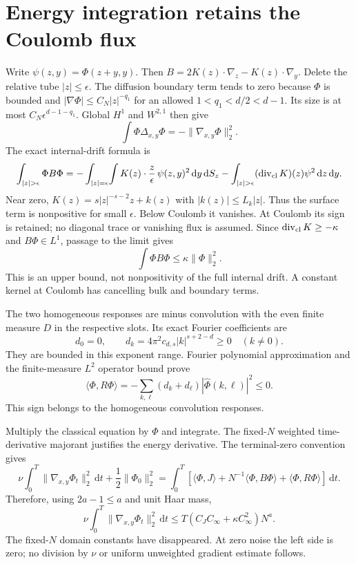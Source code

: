 \documentclass[10pt]{article}
\newcommand{\dd}{\,\mathrm d}
\begin{document}
\section*{Energy integration retains the Coulomb flux}
Write $\psi(z,y)=\Phi(z+y,y)$. Then
$B=2K(z)\cdot\nabla_z-K(z)\cdot\nabla_y$.
Delete the relative tube $|z|\le\epsilon$. The diffusion boundary term tends
to zero because $\Phi$ is bounded and
$|\nabla\Phi|\le C_N|z|^{-q_1}$ for an allowed $1<q_1<d/2<d-1$.
Its size is at most $C_N\epsilon^{d-1-q_1}$. Global $H^1$ and $W^{2,1}$
then give
\[
 \int\Phi\Delta_{x,y}\Phi=-\|\nabla_{x,y}\Phi\|_2^2.
\]
The exact internal-drift formula is
\[
 \int_{|z|>\epsilon}\Phi B\Phi
 =-\int_{|z|=\epsilon}\!\int K(z)\cdot\frac z\epsilon\,
        \psi(z,y)^2\dd y\dd S_z
  -\int_{|z|>\epsilon}(\operatorname{div}_{\rm cl}K)(z)\psi^2\dd z\dd y.
\]
Near zero, $K(z)=s|z|^{-s-2}z+k(z)$ with $|k(z)|\le L_k|z|$.
Thus the surface term is nonpositive for small $\epsilon$. Below Coulomb
it vanishes. At Coulomb its sign is retained; no diagonal trace or vanishing
flux is assumed. Since $\operatorname{div}_{\rm cl}K\ge-\kappa$ and
$B\Phi\in L^1$, passage to the limit gives
\[
 \int\Phi B\Phi\le\kappa\|\Phi\|_2^2.
\]
This is an upper bound, not nonpositivity of the full internal drift. A
constant kernel at Coulomb has cancelling bulk and boundary terms.

The two homogeneous responses are minus convolution with the even finite
measure $D$ in the respective slots. Its exact Fourier coefficients are
\[
 d_0=0,\qquad d_k=4\pi^2c_{d,s}|k|^{s+2-d}\ge0\quad(k\ne0).
\]
They are bounded in this exponent range. Fourier polynomial approximation
and the finite-measure $L^2$ operator bound prove
\[
 \langle\Phi,R\Phi\rangle=-\sum_{k,\ell}(d_k+d_\ell)
 |\widehat\Phi(k,\ell)|^2\le0.
\]
This sign belongs to the homogeneous convolution responses.

Multiply the classical equation by $\Phi$ and integrate. The fixed-$N$
weighted time-derivative majorant justifies the energy derivative. The
terminal-zero convention gives
\[
 \nu\int_0^T\|\nabla_{x,y}\Phi_t\|_2^2\dd t+\frac12\|\Phi_0\|_2^2
 =\int_0^T\!\left[\langle\Phi,J\rangle+
 N^{-1}\langle\Phi,B\Phi\rangle+\langle\Phi,R\Phi\rangle\right]\dd t.
\]
Therefore, using $2a-1\le a$ and unit Haar mass,
\[
 \boxed{\quad\nu\int_0^T\|\nabla_{x,y}\Phi_t\|_2^2\dd t
 \le T(C_JC_\infty+\kappa C_\infty^2)N^a.\quad}
\]
The fixed-$N$ domain constants have disappeared. At zero noise the left side
is zero; no division by $\nu$ or uniform unweighted gradient estimate follows.
\end{document}

